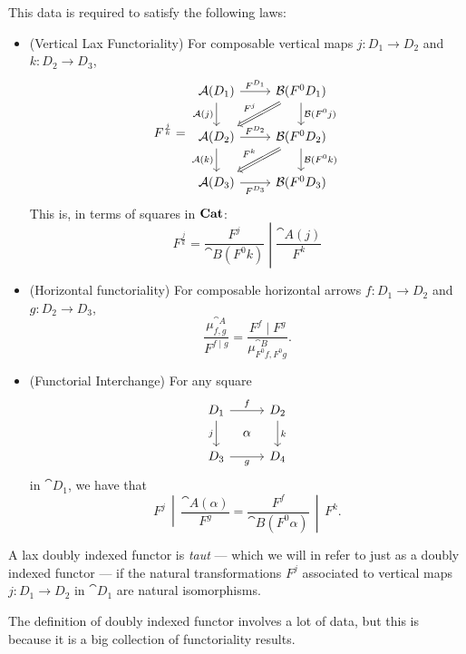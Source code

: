 \documentclass[DynamicalBook]{subfiles}
\begin{document}
\begin{definition}
This data is required to satisfy the following laws:
\begin{itemize}
  \item (Vertical Lax Functoriality) For composable vertical maps $j : D_1 \to D_2$ and $k :
    D_2 \to D_3$, 
\[
F^{\frac{j}{k}} = 
\begin{tikzcd}
  \cat{A}(D_1) \ar[d, "{\cat{A}(j)}"'] \ar[r, "F^{D_1}"] & \cat{B}(F^0D_1)
\ar[dl, Rightarrow, "F^j"']  \ar[d, "\cat{B}(F^0j)"]  \\
\cat{A}(D_2) \ar[d, "{\cat{A}(k)}"']\ar[r,"F^{D_2}"] & \cat{B}(F^0D_2)\ar[d, "\cat{B}(F^0k)"] \ar[dl, Rightarrow, "F^k"'] \\
\cat{A}(D_3) \ar[r,"F^{D_3}"']& \cat{B}(F^0D_3) 
\end{tikzcd}
\]
This is, in terms of squares in $\textbf{Cat}$:
    $$F^{\frac{j}{k}} = \left. \frac{F^j}{\cat{B}(F^0k)} \middle| \frac{\cat{A}(j)}{F^k} \right.$$
  \item (Horizontal functoriality) For composable horizontal arrows $f : D_1 \to
    D_2$ and $g : D_2 \to D_3$, 
$$\frac{\mu^{\cat{A}}_{f, g}}{F^{f \mid g}} = \frac{F^f \mid
  F^g}{\mu^{\cat{B}}_{F^0f, F^0g}}.$$ 
\item (Functorial Interchange) For any square
\[
\begin{tikzcd}[sep=tiny]
D_1 \ar[rr, "f"] \ar[dd, "j"'] & & D_2 \ar[dd, "k"] \\
 & \alpha & \\
D_3 \ar[rr, "g"'] & & D_4
\end{tikzcd}
\]
in $\cat{D}_1$, we have that
\[
  \left. F^j \,\middle|\, \frac{\cat{A}(\alpha)}{F^g} \right. = \left.
    \frac{F^f}{\cat{B}(F^0 \alpha)} \,\middle|\, F^k \right. .
\]
\end{itemize}

A lax doubly indexed functor is \emph{taut} --- which we will in refer to just
as a doubly indexed functor --- if the natural transformations $F^j$ associated
to vertical maps $j : D_1 \to D_2$ in $\cat{D}_1$ are natural isomorphisms.

\end{definition}

The definition of doubly indexed functor involves a lot of data, but this is
because it is a big collection of functoriality results. 
\end{document}
